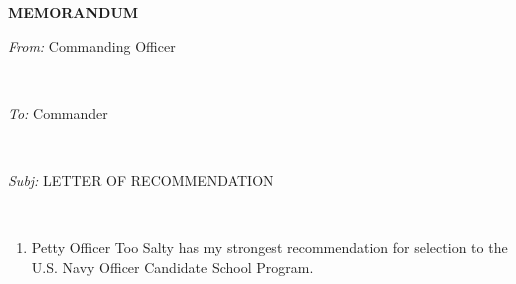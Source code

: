 \documentclass[11pt]{article}
\begin{document}
\\[0.5cm]
	
\hspace*{9.5cm}{\textbf{\today}}\\[0.5cm]

\begin{flushleft}
\hspace*{-4cm}\textsc{\Large \textbf{MEMORANDUM}}\\[0.5cm]
\begin{minipage}{0.4\textwidth}
\hspace*{-4cm}\large
\emph{From:}
Commanding Officer
\end{minipage}\\[0.25cm]

\begin{minipage}{0.4\textwidth}
\hspace*{-4cm}\large
\emph{To:} 
Commander
\end{minipage}\\[0.25cm]

\begin{minipage}{0.4\textwidth}
\hspace*{-4cm}\large
\emph{Subj:} 
LETTER OF RECOMMENDATION
\end{minipage}\\[0.25cm]
\end{flushleft}

\begin{enumerate}
\item Petty Officer Too Salty has my strongest recommendation for selection to the U.S. Navy Officer Candidate School Program.
\end{enumerate}
\end{document}

